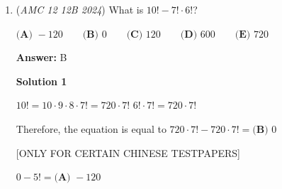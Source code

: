 \begin{enumerate}
\textbf{Solution 4}

Since the person is the 1013th person from the left and the 1010th person from the right, there are 1009 people after the 1013th person. 

 Therefore, there are 1013 + 1009 = $\boxed{\textbf{(B) } 2022}$ people in line.

 (Note: Similarly, you can perceive this information as 1012 people to the left of 1010 people and proceed.)

 



\textbf{Solution 5 (Think of a Pattern)}

If you are second going from the left and third going from the right, there are the third person out of four people $p_1,\; p_2,\; p_3,\; p_4$.

 We can simply add $1013+1010$ and subtract $1$ since you are counting yourself twice, giving $1013 + 1009$ = $\boxed{\textbf{(B) } 2022}$




\textbf{Solution 6 (Counting Along)}

The $1014$th person from the left is the $1009$th person from the right. The $1015$th person from the left is the $1008$th person from the right, and so on.

 We can see that the $n$th person from the left is the $2023 - n$th person from the left, so we can get that the first person from the right is the $2022$nd person from the left, and there are $\boxed{\textbf{(B) } 2022}$ people in the line.

 


	\item (\textit{AMC 12 12B 2024}) What is $10! - 7! \cdot 6!$?


 $\textbf{(A) }-120 \qquad\textbf{(B) }0 \qquad\textbf{(C) }120 \qquad\textbf{(D) }600 \qquad\textbf{(E) }720 \qquad$

 \textbf{Answer: }B



\textbf{Solution 1}

$10! = 10 \cdot 9 \cdot 8 \cdot 7! = 720 \cdot 7!$
$6! \cdot 7! = 720 \cdot 7!$

 Therefore, the equation is equal to $720 \cdot 7! - 720 \cdot 7! = \boxed{\textbf{(B) }0}$

 [ONLY FOR CERTAIN CHINESE TESTPAPERS]

 $0 - 5! = \boxed{\textbf{(A) }-120}$





\end{enumerate}
